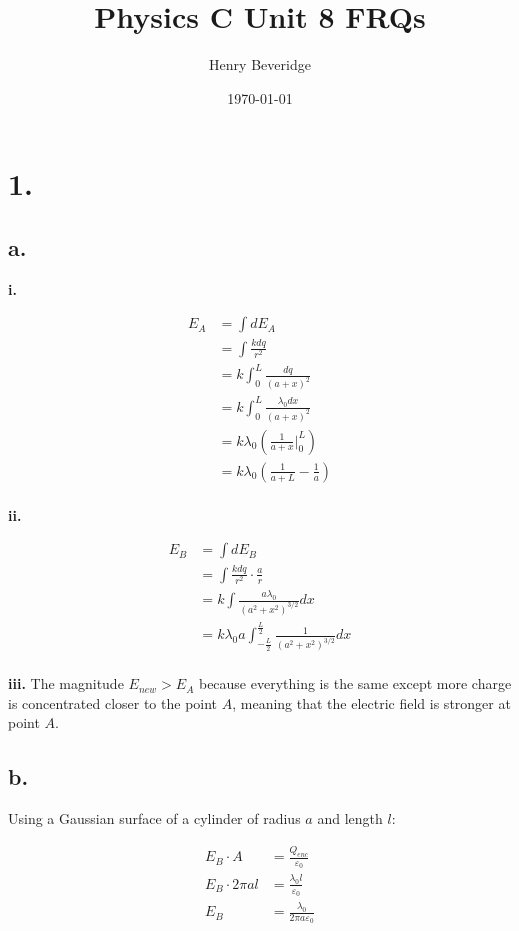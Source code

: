 \documentclass{article}
\title{Physics C Unit 8 FRQs}
\author{Henry Beveridge}
\date{\today}
\begin{document}
\maketitle

\section*{1.}

\subsection*{a.}

\textbf{i.}

\begin{align*}
  E_A &= \int dE_A \\
  &= \int \frac{k dq}{r^2} \\
  &= k \int_0^L \frac{dq}{(a+x)^2} \\
  &= k \int_0^L \frac{\lambda_0 dx}{(a+x)^2} \\
  &= k \lambda_0 \left(\frac{1}{a+x} \Big|_0^L\right) \\
  &= k \lambda_0 \left(\frac{1}{a+L} - \frac{1}{a}\right) \\
\end{align*}

\textbf{ii.}

\begin{align*}
  E_B &= \int dE_B \\
  &= \int \frac{k dq}{r^2} \cdot \frac{a}{r} \\
  &= k \int \frac{a \lambda_0}{(a^2+x^2)^{3/2}} dx \\
  &= k \lambda_0 a \int_{-\frac{L}{2}}^{\frac{L}{2}} \frac{1}{(a^2+x^2)^{3/2}} dx \\
\end{align*}

\textbf{iii.} The magnitude $E_{new}>E_A$ because everything is the same except more charge is concentrated closer
to the point $A$, meaning that the electric field is stronger at point $A$.

\subsection*{b.}
Using a Gaussian surface of a cylinder of radius $a$ and length $l$:

\begin{align*}
  E_B\cdot A &= \frac{Q_{enc}}{\varepsilon_0}\\
  E_B\cdot 2\pi a l &= \frac{\lambda_0 l}{\varepsilon_0} \\
  E_B &= \frac{\lambda_0}{2\pi a \varepsilon_0}
\end{align*}
\end{document}
